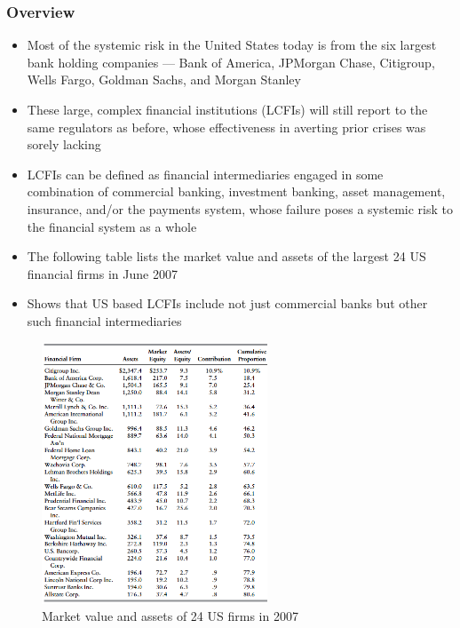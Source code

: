 \documentclass[11pt]{beamer}
\begin{document}
\begin{frame}
\begin{center}
\end{center}
\end{frame}

\begin{frame}
\frametitle{Overview}
\begin{itemize}
\item Most of the systemic risk in the United States today is from the six largest bank holding companies — Bank of America, JPMorgan Chase, Citigroup, Wells Fargo, Goldman Sachs, and Morgan Stanley
\item These large, complex financial institutions (LCFIs) will still
report to the same regulators as before, whose effectiveness in averting prior crises was sorely lacking
\item LCFIs can be defined as financial intermediaries engaged in some combination of commercial banking, investment banking, asset management, insurance, and/or the payments system, whose failure poses a systemic risk to the financial system as a whole
\item The following table lists the market value and assets of the largest 24 US financial firms in June 2007
\item Shows that US based LCFIs include not just commercial banks but other such financial intermediaries
\end{itemize}
\end{frame}

\begin{frame}
\begin{figure}
\includegraphics[width=0.6\textwidth]{7_1.png}
\caption{Market value and assets of 24 US firms in 2007}
\end{figure}
\end{frame}
\end{document}
